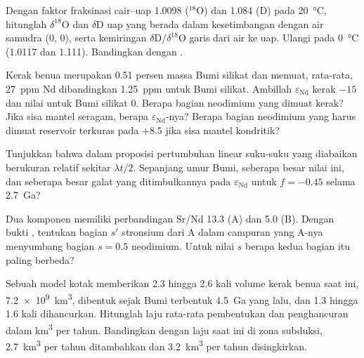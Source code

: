 \begin{exercise}[$\star\star$]\label{exo:b2:isotope-geochemistry:8}
Dengan faktor fraksinasi cair--uap 1.0098 ($^{18}$O) dan 1.084 (D) pada
\qty{20}{\degreeCelsius}, hitunglah $\delta^{18}\mathrm{O}$ dan $\delta\mathrm{D}$
uap yang berada dalam kesetimbangan dengan air samudra (0, 0), serta kemiringan
$\delta\mathrm{D}/\delta^{18}\mathrm{O}$ garis dari air ke uap. Ulangi
pada \qty{0}{\degreeCelsius} (1.0117 dan 1.111). Bandingkan dengan .
\end{exercise}

\begin{exercise}[$\star\star$]\label{exo:b2:isotope-geochemistry:9}
Kerak benua merupakan 0.51 persen massa Bumi silikat dan memuat,
rata-rata, \qty{27}{ppm} Nd dibandingkan \qty{1.25}{ppm} untuk Bumi silikat. Ambillah
$\varepsilon_{\mathrm{Nd}}$ kerak $-15$ dan nilai untuk Bumi silikat 0. Berapa
bagian neodimium yang dimuat kerak? Jika sisa mantel seragam,
berapa $\varepsilon_{\mathrm{Nd}}$-nya? Berapa bagian neodimium yang harus dimuat
reservoir terkuras pada $+8.5$ jika sisa mantel kondritik?
\end{exercise}

\begin{exercise}[$\star\star\star$]\label{exo:b2:isotope-geochemistry:10}
Tunjukkan bahwa dalam proposisi pertumbuhan linear suku-suku yang diabaikan berukuran relatif
sekitar $\lambda t/2$. Sepanjang umur Bumi, seberapa besar nilai ini, dan seberapa
besar galat yang ditimbulkannya pada $\varepsilon_{\mathrm{Nd}}$ untuk $f = -0.45$ selama
\qty{2.7}{Ga}?
\end{exercise}

\begin{exercise}[$\star\star\star$]\label{exo:b2:isotope-geochemistry:11}
Dua komponen memiliki perbandingan Sr/Nd 13.3 (A) dan 5.0 (B). Dengan bukti
, tentukan bagian $s'$ stronsium dari A dalam campuran yang A-nya
menyumbang bagian $s = 0.5$ neodimium. Untuk nilai $s$ berapa kedua
bagian itu paling berbeda?
\end{exercise}

\begin{exercise}[$\star\star\star$]\label{exo:b2:isotope-geochemistry:12}
Sebuah model kotak memberikan 2.3 hingga 2.6 kali volume kerak benua saat ini,
\qty{7.2e9}{km^3}, dibentuk sejak Bumi terbentuk \qty{4.5}{Ga} yang lalu, dan 1.3 hingga 1.6
kali dihancurkan. Hitunglah laju rata-rata pembentukan dan penghancuran dalam
\unit{km^3} per tahun. Bandingkan dengan laju saat ini di zona subduksi,
\qty{2.7}{km^3} per tahun ditambahkan dan \qty{3.2}{km^3} per tahun disingkirkan.
\end{exercise}

